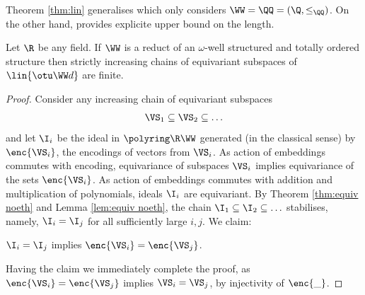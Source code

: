 Theorem \ref{thm:lin} generalises \cite[Lemma IV.8]{BKM21} which only considers
$\WW = \QQ = (\Q, \leq_\QQ)$. 
On the other hand, \cite{BKM21} provides explicite upper bound on the length.
%
\begin{theorem} 
\label{thm:lin}
Let $\R$ be any field.
If $\WW$ is a reduct of an $\omega$-well structured and totally ordered structure then
strictly increasing chains of equivariant subspaces of $\lin {\otu \WW d}$ are finite.
\end{theorem}
%
%
\begin{proof}%
Consider any increasing chain of equivariant subspaces
\[
\VS_1 \subseteq 
\VS_2 \subseteq \ldots 
\]
and let $\I_i$ be the ideal in $\polyring \R \WW$ generated
(in the classical sense) by $\enc{\VS_i}$, the encodings
of vectors from $\VS_i$.
As action of embeddings commutes with encoding,
equivariance of subspaces $\VS_i$ implies equivariance of the sets $\enc{\VS_i}$.
As action of embeddings commutes with addition and multiplication of polynomials, 
ideals $\I_i$ are equivariant.
By Theorem \ref{thm:equiv noeth} and Lemma \ref{lem:equiv noeth}, the chain 
$
\I_1 \subseteq \I_2 \subseteq \ldots
$
stabilises, namely, $\I_i = \I_j$ for all sufficiently large $i,j$.
We claim:
%
\begin{claim}
$\I_i = \I_j$ implies $\enc{\VS_i} = \enc{\VS_j}$.
\end{claim}
%
\noindent
Having the claim we immediately complete the proof, as 
$\enc{\VS_i} = \enc{\VS_j}$ implies $\VS_i = \VS_j$, by injectivity of $\enc{\_}$.


\end{proof}

